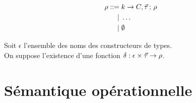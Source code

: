 \begin{align*}
  \rho ::=& \; k \rightarrow C, \vec{\tau} \,;\, \rho
  \\ |& \; \ldots
  \\ |& \; \emptyset
\end{align*}

Soit $\epsilon$ l'ensemble des noms des constructeurs de types. \\
On suppose l'existence d'une fonction 
$\delta : \epsilon \times \vec{\tau} \to \rho$.


\section{Sémantique opérationnelle}

